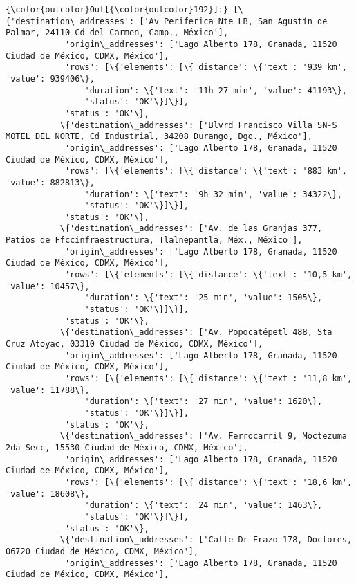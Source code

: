 \documentclass[11pt]{article}
\begin{document}
\begin{Verbatim}[commandchars=\\\{\}]
{\color{outcolor}Out[{\color{outcolor}192}]:} [\{'destination\_addresses': ['Av Periferica Nte LB, San Agustín de Palmar, 24110 Cd del Carmen, Camp., México'],
            'origin\_addresses': ['Lago Alberto 178, Granada, 11520 Ciudad de México, CDMX, México'],
            'rows': [\{'elements': [\{'distance': \{'text': '939 km', 'value': 939406\},
                'duration': \{'text': '11h 27 min', 'value': 41193\},
                'status': 'OK'\}]\}],
            'status': 'OK'\},
           \{'destination\_addresses': ['Blvrd Francisco Villa SN-S MOTEL DEL NORTE, Cd Industrial, 34208 Durango, Dgo., México'],
            'origin\_addresses': ['Lago Alberto 178, Granada, 11520 Ciudad de México, CDMX, México'],
            'rows': [\{'elements': [\{'distance': \{'text': '883 km', 'value': 882813\},
                'duration': \{'text': '9h 32 min', 'value': 34322\},
                'status': 'OK'\}]\}],
            'status': 'OK'\},
           \{'destination\_addresses': ['Av. de las Granjas 377, Patios de Ffccinfraestructura, Tlalnepantla, Méx., México'],
            'origin\_addresses': ['Lago Alberto 178, Granada, 11520 Ciudad de México, CDMX, México'],
            'rows': [\{'elements': [\{'distance': \{'text': '10,5 km', 'value': 10457\},
                'duration': \{'text': '25 min', 'value': 1505\},
                'status': 'OK'\}]\}],
            'status': 'OK'\},
           \{'destination\_addresses': ['Av. Popocatépetl 488, Sta Cruz Atoyac, 03310 Ciudad de México, CDMX, México'],
            'origin\_addresses': ['Lago Alberto 178, Granada, 11520 Ciudad de México, CDMX, México'],
            'rows': [\{'elements': [\{'distance': \{'text': '11,8 km', 'value': 11788\},
                'duration': \{'text': '27 min', 'value': 1620\},
                'status': 'OK'\}]\}],
            'status': 'OK'\},
           \{'destination\_addresses': ['Av. Ferrocarril 9, Moctezuma 2da Secc, 15530 Ciudad de México, CDMX, México'],
            'origin\_addresses': ['Lago Alberto 178, Granada, 11520 Ciudad de México, CDMX, México'],
            'rows': [\{'elements': [\{'distance': \{'text': '18,6 km', 'value': 18608\},
                'duration': \{'text': '24 min', 'value': 1463\},
                'status': 'OK'\}]\}],
            'status': 'OK'\},
           \{'destination\_addresses': ['Calle Dr Erazo 178, Doctores, 06720 Ciudad de México, CDMX, México'],
            'origin\_addresses': ['Lago Alberto 178, Granada, 11520 Ciudad de México, CDMX, México'],

\end{Verbatim}
\end{document}
